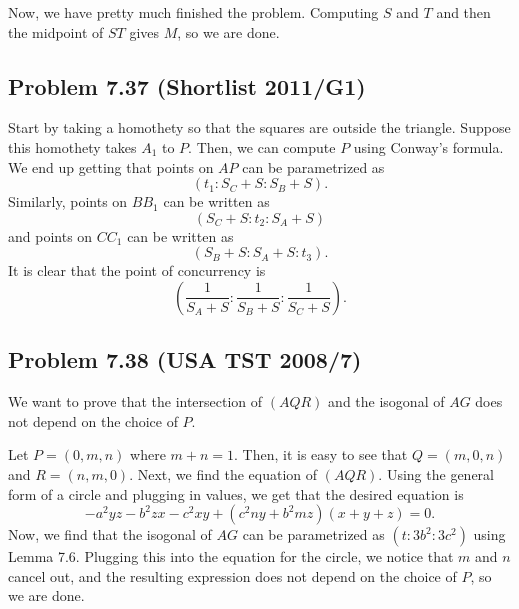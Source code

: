 \documentclass{scrartcl}
\begin{document}
Now, we have pretty much finished the problem. Computing $S$ and $T$ and then the midpoint of $ST$ gives $M$, so we are done.
\subsection*{Problem 7.37 (Shortlist 2011/G1)}
Start by taking a homothety so that the squares are outside the triangle. Suppose this homothety takes $A_1$ to $P$. Then, we can compute $P$ using Conway's formula. We end up getting that points on $AP$ can be parametrized as
\[ (t_1 : S_C + S : S_B + S). \]
Similarly, points on $BB_1$ can be written as
\[ (S_C + S : t_2 : S_A + S) \]
and points on $CC_1$ can be written as
\[ (S_B + S : S_A + S : t_3). \]
It is clear that the point of concurrency is
\[ \left(\frac{1}{S_A + S} : \frac{1}{S_B + S} : \frac{1}{S_C + S}\right). \]
\subsection*{Problem 7.38 (USA TST 2008/7)}
We want to prove that the intersection of $(AQR)$ and the isogonal of $AG$ does not depend on the choice of $P$.

Let $P = (0, m, n)$ where $m + n = 1$. Then, it is easy to see that $Q = (m, 0, n)$ and $R = (n, m, 0)$.
Next, we find the equation of $(AQR)$. Using the general form of a circle and plugging in values, we get
that the desired equation is
\[ -a^2yz - b^2zx - c^2xy + (c^2ny + b^2mz)(x + y + z) = 0. \]
Now, we find that the isogonal of $AG$ can be parametrized as $(t : 3b^2 : 3c^2)$ using Lemma 7.6. Plugging this
into the equation for the circle, we notice that $m$ and $n$ cancel out, and the resulting expression does not
depend on the choice of $P$, so we are done.
\end{document}
